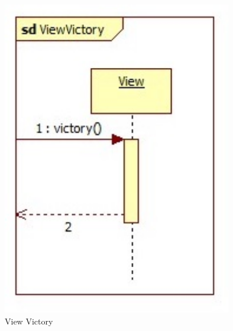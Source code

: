\begin{figure}[H]
	\begin{center}
		\includegraphics[width=10cm]{chapters/chapter11/seq/View_Victory.jpg}
		\caption{View Victory}
		\label{View Victory}
	\end{center}
\end{figure}


